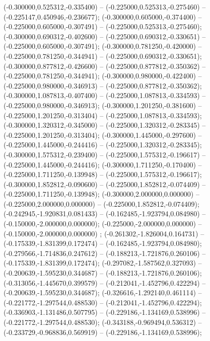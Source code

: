  (-0.300000,0.525312,-0.335400) -- (-0.225000,0.525313,-0.275460) -- (-0.225147,0.450946,-0.236677);
 (-0.300000,0.605000,-0.374400) -- (-0.225000,0.605000,-0.307491) -- (-0.225000,0.525313,-0.275460);
 (-0.300000,0.690312,-0.402600) -- (-0.225000,0.690312,-0.330651) -- (-0.225000,0.605000,-0.307491);
 (-0.300000,0.781250,-0.420000) -- (-0.225000,0.781250,-0.344941) -- (-0.225000,0.690312,-0.330651);
 (-0.300000,0.877812,-0.426600) -- (-0.225000,0.877812,-0.350362) -- (-0.225000,0.781250,-0.344941);
 (-0.300000,0.980000,-0.422400) -- (-0.225000,0.980000,-0.346913) -- (-0.225000,0.877812,-0.350362);
 (-0.300000,1.087813,-0.407400) -- (-0.225000,1.087813,-0.334593) -- (-0.225000,0.980000,-0.346913);
 (-0.300000,1.201250,-0.381600) -- (-0.225000,1.201250,-0.313404) -- (-0.225000,1.087813,-0.334593);
 (-0.300000,1.320312,-0.345000) -- (-0.225000,1.320312,-0.283345) -- (-0.225000,1.201250,-0.313404);
 (-0.300000,1.445000,-0.297600) -- (-0.225000,1.445000,-0.244416) -- (-0.225000,1.320312,-0.283345);
 (-0.300000,1.575312,-0.239400) -- (-0.225000,1.575312,-0.196617) -- (-0.225000,1.445000,-0.244416);
 (-0.300000,1.711250,-0.170400) -- (-0.225000,1.711250,-0.139948) -- (-0.225000,1.575312,-0.196617);
 (-0.300000,1.852812,-0.090600) -- (-0.225000,1.852812,-0.074409) -- (-0.225000,1.711250,-0.139948);
 (-0.300000,2.000000,0.000000) -- (-0.225000,2.000000,0.000000) -- (-0.225000,1.852812,-0.074409);
 (-0.242945,-1.920831,0.081433) -- (-0.162485,-1.923794,0.084980) -- (-0.150000,-2.000000,0.000000);
 (-0.225000,-2.000000,0.000000) -- (-0.150000,-2.000000,0.000000) ;
 (-0.261302,-1.826004,0.164731) -- (-0.175339,-1.831399,0.172474) -- (-0.162485,-1.923794,0.084980);
 (-0.279566,-1.714836,0.247612) -- (-0.188213,-1.721876,0.260106) -- (-0.175339,-1.831399,0.172474);
 (-0.297082,-1.587562,0.327093) -- (-0.200639,-1.595230,0.344687) -- (-0.188213,-1.721876,0.260106);
 (-0.313056,-1.445670,0.399579) -- (-0.212041,-1.452796,0.422294) -- (-0.200639,-1.595230,0.344687);
 (-0.326616,-1.292140,0.461114) -- (-0.221772,-1.297544,0.488530) -- (-0.212041,-1.452796,0.422294);
 (-0.336903,-1.131486,0.507795) -- (-0.229186,-1.134169,0.538996) -- (-0.221772,-1.297544,0.488530);
 (-0.343188,-0.969494,0.536312) -- (-0.233729,-0.968836,0.569919) -- (-0.229186,-1.134169,0.538996);
